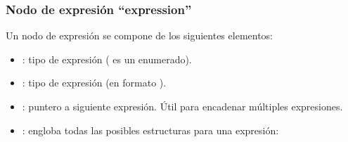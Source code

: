 \subsubsection{Nodo de expresión ``expression''}
\noindent
Un nodo de expresión se compone de los siguientes elementos:
\begin{itemize}
    \item {} : tipo de expresión ( es un enumerado).
    \item {} : tipo de expresión (en formato ).
    \item {} : puntero a siguiente expresión. Útil para encadenar múltiples expresiones.
    \item {} : engloba todas las posibles estructuras para una expresión:


\end{itemize}
